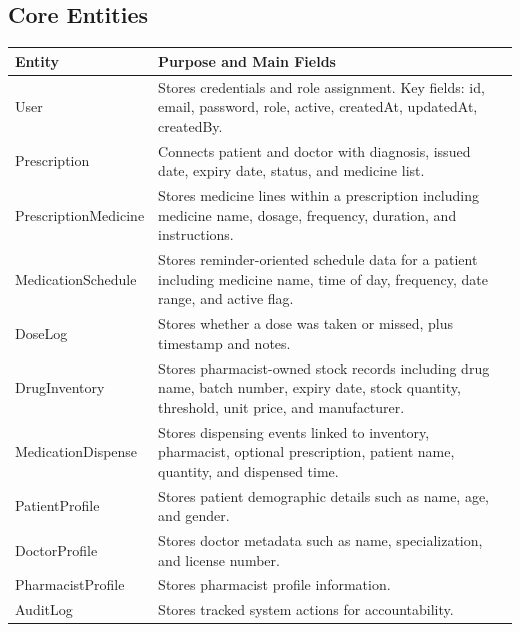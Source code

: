 \documentclass[12pt,a4paper]{article}
\begin{document}
\subsection{Core Entities}
\begin{longtable}{>{\raggedright\arraybackslash}p{} >{\raggedright\arraybackslash}p{}}
\toprule
\textbf{Entity} & \textbf{Purpose and Main Fields} \\
\midrule
\endhead
User & Stores credentials and role assignment. Key fields: id, email, password, role, active, createdAt, updatedAt, createdBy. \\
Prescription & Connects patient and doctor with diagnosis, issued date, expiry date, status, and medicine list. \\
PrescriptionMedicine & Stores medicine lines within a prescription including medicine name, dosage, frequency, duration, and instructions. \\
MedicationSchedule & Stores reminder-oriented schedule data for a patient including medicine name, time of day, frequency, date range, and active flag. \\
DoseLog & Stores whether a dose was taken or missed, plus timestamp and notes. \\
DrugInventory & Stores pharmacist-owned stock records including drug name, batch number, expiry date, stock quantity, threshold, unit price, and manufacturer. \\
MedicationDispense & Stores dispensing events linked to inventory, pharmacist, optional prescription, patient name, quantity, and dispensed time. \\
PatientProfile & Stores patient demographic details such as name, age, and gender. \\
DoctorProfile & Stores doctor metadata such as name, specialization, and license number. \\
PharmacistProfile & Stores pharmacist profile information. \\
AuditLog & Stores tracked system actions for accountability. \\
\bottomrule
\end{longtable}
\end{document}
